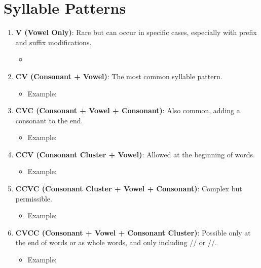 \section*{Syllable Patterns}
\begin{enumerate}
    \item \textbf{V (Vowel Only)}: Rare but can occur in specific cases, especially with prefix and suffix modifications.
    \begin{itemize}
        \item {}
    \end{itemize}
    \item \textbf{CV (Consonant + Vowel)}: The most common syllable pattern.
    \begin{itemize}
        \item Example: 
    \end{itemize}
    \item \textbf{CVC (Consonant + Vowel + Consonant)}: Also common, adding a consonant to the end.
    \begin{itemize}
        \item Example: 
    \end{itemize}
    \item \textbf{CCV (Consonant Cluster + Vowel)}: Allowed at the beginning of words.
    \begin{itemize}
        \item Example: 
    \end{itemize}
     \item \textbf{CCVC (Consonant Cluster + Vowel + Consonant)}: Complex but permissible.
    \begin{itemize}
        \item Example: 
    \end{itemize}
    \item \textbf{CVCC (Consonant + Vowel + Consonant Cluster)}: Possible only at the end of words or as whole words, and only including /\texttheta/ or /\textesh/.
    \begin{itemize}
        \item Example: 
    \end{itemize}
\end{enumerate}

